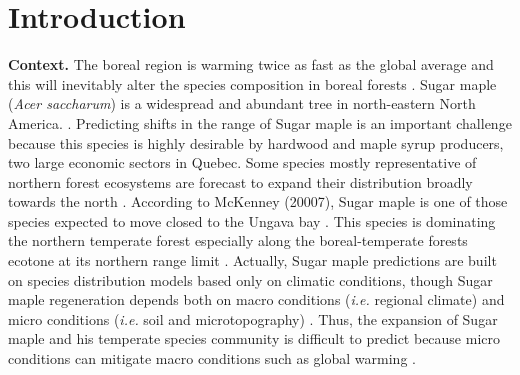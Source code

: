 


\newpage
\setcounter{page}{1}

\section{Introduction}

\textbf{Context.}  The boreal region is warming twice as fast as the global
average and  this will inevitably alter the species composition in boreal
forests \cite{Scheffer2012,Hughes2000,Lafleur2010}. Sugar maple (\textit{Acer
saccharum}) is a widespread and abundant tree in north-eastern North America.
\cite{Graignic2013,Messaoud2007,Kellman2004,Barras1998}. Predicting shifts in
the range of Sugar maple is an important challenge because this species is
highly desirable by hardwood and maple syrup producers, two large economic
sectors in Quebec. Some species mostly representative of northern forest
ecosystems are forecast to expand their distribution broadly towards the north
\cite{Sciences2014,Iverson2002}. According to McKenney (20007), Sugar maple is
one of those species expected to move closed to the Ungava bay
\cite{Sciences2014}. This species is dominating the northern temperate forest
especially along the boreal-temperate forests ecotone at its northern range
limit \cite{Barras1998}. Actually, Sugar maple predictions are built on
species distribution models based only on climatic conditions, though Sugar
maple regeneration depends both on macro conditions (\textit{i.e.} regional
climate) and micro conditions (\textit{i.e.} soil and microtopography)
\cite{Graignic2013,Lafleur2010}. Thus, the expansion of Sugar maple and his
temperate species community is difficult to predict because micro conditions
can mitigate macro conditions such as global warming \cite{DeFrenne2013}.\\

